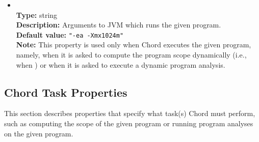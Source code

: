 \begin{itemize}
\item
{} \\
{\bf Type:} string \\
{\bf Description:} Arguments to JVM which runs the given program. \\
{\bf Default value:} {\tt "-ea -Xmx1024m"} \\
{\bf Note:} This property is used only when Chord executes the given program, namely, when it is asked to compute the program scope dynamically (i.e., when ) or when it is asked to execute a dynamic program analysis.
\end{itemize}

\subsection{Chord Task Properties}
\label{sec:chord-sysprops:task}

This section describes properties that specify what task(s) Chord must perform, 
such as computing the scope of the given program or running program analyses on the given program.

